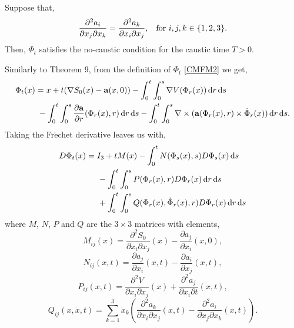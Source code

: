 \documentclass[a4paper,12pt,draft]{report}
\theoremstyle{remark}
\theoremstyle{definition}
\begin{document}
\theorem
{
Suppose that,
\begin{equation}
\frac{\partial^2 a_i}{\partial x_j \partial x_k} = \frac{\partial^2 a_k}{\partial x_i \partial x_j}, \hspace{0.3cm} \text{for } i, j, k \in \{1, 2, 3\}. \label{MFC}
\end{equation}
Then, $\Phi_t$ satisfies the no-caustic condition for the caustic time $T > 0$.
}
\proof
{
Similarly to Theorem 9, from the definition of $\Phi_t$ \eqref{CMFM2} we get,
\begin{align}
\Phi_t(x) & = x + t(\nabla S_0(x) - \bold{a}(x, 0)) - \int_0^t\int_0^s\nabla V(\Phi_r(x))\,\mathrm{d}r\,\mathrm{d}s\nonumber\\
& \hspace{0.1cm} - \int_0^t\int_0^s\frac{\partial \bold{a}}{\partial r}(\Phi_r(x), r)\,\mathrm{d}r\,\mathrm{d}s - \int_0^t\int_0^s\nabla\times(\bold{a}(\Phi_r(x), r)\times\dot{\Phi}_r(x))\,\mathrm{d}r\,\mathrm{d}s.\nonumber
\end{align}
Taking the Fr$\mathrm{\acute{e}}$chet derivative leaves us with,
\begin{align}
D\Phi_t(x) & = I_3 + tM(x) - \int_0^tN(\Phi_s(x), s)D\Phi_s(x)\,\mathrm{d}s\nonumber\\
& \hspace{0.5cm} - \int_0^t\int_0^sP(\Phi_r(x), r)D\Phi_r(x)\,\mathrm{d}r\,\mathrm{d}s\nonumber\\
& \hspace{0.5cm} + \int_0^t\int_0^sQ(\Phi_r(x), \dot{\Phi}_r(x), r)D\Phi_r(x)\,\mathrm{d}r\,\mathrm{d}s\nonumber
\end{align}
where $M$, $N$, $P$ and $Q$ are the $3 \times 3$ matrices with elements,
$$
M_{ij}(x) = \frac{\partial^2S_0}{\partial x_i \partial x_j}(x) - \frac{\partial a_j}{\partial x_i}(x, 0),
$$
$$
N_{ij}(x, t) = \frac{\partial a_j}{\partial x_i}(x, t) - \frac{\partial a_i}{\partial x_j}(x, t),
$$
$$
P_{ij}(x, t) = \frac{\partial^2V}{\partial x_i \partial x_j}(x) + \frac{\partial^2a_j}{\partial x_i \partial t}(x, t),
$$
$$
Q_{ij}(x, \dot{x}, t) = \sum_{k = 1}^3\dot{x}_k\left(\frac{\partial^2a_k}{\partial x_i \partial x_j}(x, t) - \frac{\partial^2a_i}{\partial x_j \partial x_k}(x, t)\right).
$$

}
\end{document}

